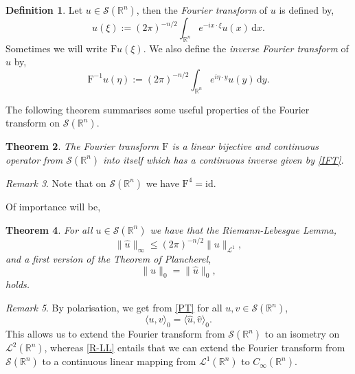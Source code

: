 \documentclass[a4paper, 12pt]{report}
\newtheorem{theorem}{Theorem}[section]
\theoremstyle{remark}
\newtheorem{remark}[theorem]{Remark}
\theoremstyle{definition}
\newtheorem{definition}[theorem]{Definition}
\begin{document}
\begin{definition}
Let $u \in \mathcal{S}(\mathbb{R}^n)$, then the \emph{Fourier transform} of $u$ is defined by,
\begin{equation}
\hat{u}(\xi) := (2\pi)^{-n/2}\int_{\mathbb{R}^n}e^{-ix\cdot\xi}u(x)\,\mathrm{d}x.
\end{equation}
Sometimes we will write $\mathrm{F}u(\xi)$.  We also define the \emph{inverse Fourier transform} of $u$ by,
\begin{equation}
\mathrm{F}^{-1}u(\eta) := (2\pi)^{-n/2}\int_{\mathbb{R}^n}e^{i\eta\cdot y}u(y)\,\mathrm{d}y.\label{IFT}
\end{equation}
\end{definition}
The following theorem summarises some useful properties of the Fourier transform on $\mathcal{S}(\mathbb{R}^n)$.

\begin{theorem}
The Fourier transform $\mathrm{F}$ is a linear bijective and continuous operator from $\mathcal{S}(\mathbb{R}^n)$ into itself which has a continuous inverse given by \eqref{IFT}.
\end{theorem}
\begin{remark}
Note that on $\mathcal{S}(\mathbb{R}^n)$ we have $\mathrm{F}^4 = \mathrm{id}$.
\end{remark}
Of importance will be,
\begin{theorem}
For all $u \in \mathcal{S}(\mathbb{R}^n)$ we have that the Riemann-Lebesgue Lemma,
\begin{equation}
\|\hat{u}\|_\infty \le (2\pi)^{-n/2}\|u\|_{\mathcal{L}^1},\label{R-LL}
\end{equation}
and a first version of the Theorem of Plancherel,
\begin{equation}
\|u\|_0 = \|\hat{u}\|_0,\label{PT}
\end{equation}
holds.
\end{theorem}
\begin{remark}
By polarisation, we get from \eqref{PT} for all $u, v \in \mathcal{S}(\mathbb{R}^n)$,
\begin{equation}
\langle u, v\rangle_0 = \langle\hat{u}, \hat{v}\rangle_0.
\end{equation}
This allows us to extend the Fourier transform from $\mathcal{S}(\mathbb{R}^n)$ to an isometry on $\mathcal{L}^2(\mathbb{R}^n)$, whereas \eqref{R-LL} entails that we can extend the Fourier transform from $\mathcal{S}(\mathbb{R}^n)$ to a continuous linear mapping from $\mathcal{L}^1(\mathbb{R}^n)$ to $C_\infty(\mathbb{R}^n)$.
\end{remark}
\end{document}
